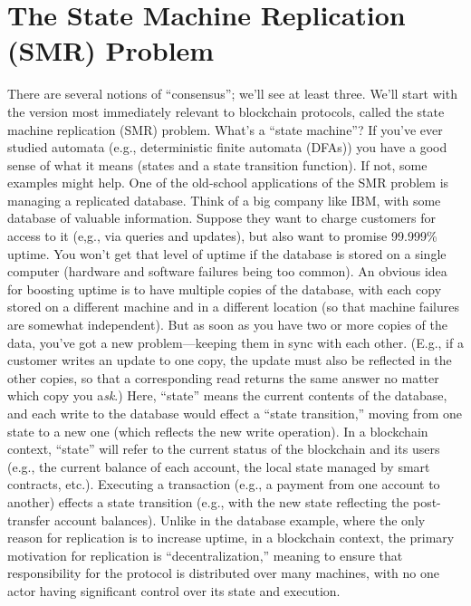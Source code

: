 \section{The State Machine Replication (SMR) Problem}
There are several notions of “consensus”; we’ll see at least three. We’ll start with the version most immediately relevant to blockchain protocols, called the state machine replication
(SMR) problem. What’s a “state machine”? If you’ve ever studied automata (e.g., deterministic finite automata (DFAs)) you have a good sense of what it means (states and a state
transition function). If not, some examples might help.
One of the old-school applications of the SMR problem is managing a replicated database.
Think of a big company like IBM, with some database of valuable information. Suppose
they want to charge customers for access to it (e,g., via queries and updates), but also want
to promise 99.999\% uptime. You won’t get that level of uptime if the database is stored
on a single computer (hardware and software failures being too common). An obvious
idea for boosting uptime is to have multiple copies of the database, with each copy stored
on a different machine and in a different location (so that machine failures are somewhat
independent). But as soon as you have two or more copies of the data, you’ve got a new
problem—keeping them in sync with each other. (E.g., if a customer writes an update to
one copy, the update must also be reflected in the other copies, so that a corresponding read
returns the same answer no matter which copy you a\textit{sk}.) Here, “state” means the current
contents of the database, and each write to the database would effect a “state transition,”
moving from one state to a new one (which reflects the new write operation).
In a blockchain context, “state” will refer to the current status of the blockchain and its
users (e.g., the current balance of each account, the local state managed by smart contracts, etc.). Executing a transaction (e.g., a payment from one account to another) effects a state
transition (e.g., with the new state reflecting the post-transfer account balances). Unlike
in the database example, where the only reason for replication is to increase uptime, in a
blockchain context, the primary motivation for replication is “decentralization,” meaning to
ensure that responsibility for the protocol is distributed over many machines, with no one
actor having significant control over its state and execution.

